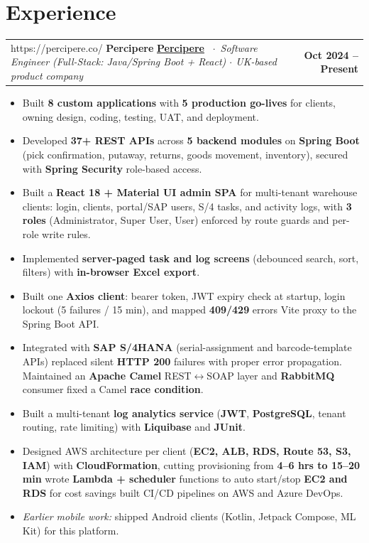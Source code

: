 \documentclass[11pt, letterpaper]{article}
\makeatletter
\newcommand{\bodysz}{\fontsize{10.5}{12.4}\selectfont}
\newcommand{\bn}[1]{{\bfseries\color{NavyTx}#1}}
\newcommand{\role}[4]{%
  \noindent
  \begin{tabularx}{\linewidth}{@{}>{\raggedright\arraybackslash}X r@{}}
    \ifx\relax#2\relax
      {\small\bfseries\color{NavyTx}#1}%
    \else
      {\small\bfseries\href{#2}{\color{BlueAc}#1}}%
    \fi
    {\footnotesize\color{MetaTx}\ $\cdot$\ \textit{#3}}
    & {\footnotesize\bfseries\color{NavyTx}#4}\tabularnewline
  \end{tabularx}\vspace{1pt}%
}
\newenvironment{blist}{%
  \begin{itemize}[leftmargin=1.1em, itemsep=2pt, topsep=0pt, parsep=0pt,
                  label={\textcolor{BlueAc}{\small$\bullet$}}]
  \bodysz\color{BodyTx}
}{%
  \end{itemize}\vspace{2pt}
}
\makeatother
\begin{document}
\section{Experience}

\role{Percipere}{https://percipere.co/}%
     {Software Engineer (Full-Stack: Java/Spring Boot + React) $\cdot$ UK-based product company}%
     {Oct 2024 -- Present}
\begin{blist}
  \item Built \bn{8 custom applications} with \bn{5 production go-lives} for clients, owning
        design, coding, testing, UAT, and deployment.
  \item Developed \bn{37+ REST APIs} across \bn{5 backend modules} on \bn{Spring Boot} (pick confirmation, putaway,
        returns, goods movement, inventory), secured with \bn{Spring Security} role-based access.
  \item Built a \bn{React 18 + Material UI admin SPA} for multi-tenant warehouse clients: login, clients,
        portal/SAP users, S/4 tasks, and activity logs, with \bn{3 roles} (Administrator, Super User, User) enforced by
        route guards and per-role write rules.
  \item Implemented \bn{server-paged task and log screens} (debounced search, sort, filters) with
        \bn{in-browser Excel export}.
  \item Built one \bn{Axios client}: bearer token, JWT expiry check at startup, login lockout
        (5 failures / 15 min), and mapped \bn{409/429} errors Vite proxy to the Spring Boot API.
  \item Integrated with \bn{SAP S/4HANA} (serial-assignment and barcode-template APIs) replaced silent \bn{HTTP 200}
        failures with proper error propagation. Maintained an \bn{Apache Camel} REST$\leftrightarrow$SOAP layer and \bn{RabbitMQ} consumer fixed a Camel \bn{race condition}.
  \item Built a multi-tenant \bn{log analytics service} (\bn{JWT}, \bn{PostgreSQL}, tenant routing, rate limiting) with
        \bn{Liquibase} and \bn{JUnit}.
  \item Designed AWS architecture per client (\bn{EC2, ALB, RDS, Route 53, S3, IAM}) with \bn{CloudFormation}, cutting
        provisioning from \bn{4--6 hrs to 15--20 min} wrote \bn{Lambda + scheduler} functions to auto start/stop
        \bn{EC2 and RDS} for cost savings built CI/CD pipelines on AWS and Azure DevOps.
  \item \textit{Earlier mobile work:} shipped Android clients (Kotlin, Jetpack Compose, ML Kit) for this platform.
\end{blist}
\end{document}
